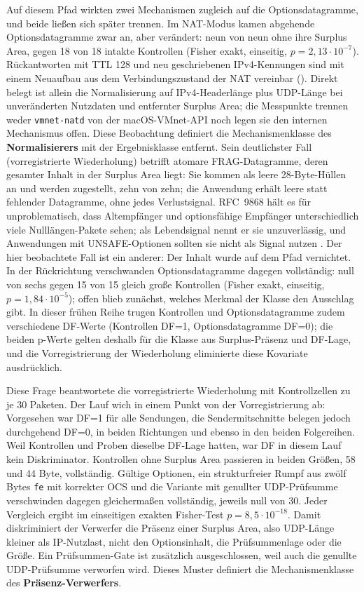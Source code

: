 Auf diesem Pfad wirkten zwei Mechanismen zugleich auf die Optionsdatagramme, und beide ließen sich
später trennen. Im NAT-Modus kamen abgehende Options\-datagramme zwar an, aber verändert:
neun von neun ohne ihre Surplus Area, gegen 18 von 18 intakte Kontrollen (Fisher exakt, einseitig,
$p = 2{,}13 \cdot 10^{-7}$). Rückantworten mit TTL 128 und neu geschriebenen IPv4-Kennungen sind mit
einem Neuaufbau aus dem Verbindungszustand der NAT vereinbar (). Direkt belegt
ist allein die Normalisierung auf IPv4-Headerlänge plus UDP-Länge bei unveränderten Nutzdaten und
entfernter Surplus Area; die Messpunkte trennen weder \texttt{vmnet-natd} von der macOS-VMnet-API noch
legen sie den internen Mechanismus offen. Diese Beobachtung definiert die Mechanismenklasse
des \textbf{Normalisierers} mit der Ergebnis\-klasse entfernt. Sein deutlichster Fall (vorregistrierte
Wiederholung) betrifft atomare FRAG-Datagramme, deren gesamter Inhalt in der Surplus Area
liegt: Sie kommen als leere 28-Byte-Hüllen an und werden zugestellt, zehn von zehn; die Anwendung erhält
leere statt fehlender Datagramme, ohne jedes Verlustsignal. RFC~9868 hält es für unproblematisch, dass
Alt\-emp\-fänger und optionsfähige Empfänger unterschiedlich viele Nulllängen-Pakete sehen; als Lebend\-signal
nennt er sie unzuverlässig, und Anwendungen mit UNSAFE-Optionen sollten sie nicht als Signal nutzen
\cite[Sec.~6, 12 und 18]{rfc9868}. Der hier beobachtete Fall ist ein anderer: Der Inhalt wurde auf
dem Pfad vernichtet. In der Rückrichtung verschwanden Optionsdatagramme dagegen vollständig: null von sechs
gegen 15 von 15 gleich große Kontrollen (Fisher exakt, einseitig, $p = 1{,}84 \cdot 10^{-5}$); offen blieb
zunächst, welches Merkmal der Klasse den Ausschlag gibt. In dieser frühen Reihe trugen Kontrollen und
Optionsdatagramme zudem verschiedene DF-Werte (Kontrollen DF=1, Optionsdatagramme DF=0); die beiden
p-Werte gelten deshalb für die Klasse aus Surplus-Präsenz und DF-Lage, und die Vorregistrierung der
Wiederholung eliminierte diese Kovariate ausdrücklich.

Diese Frage beantwortete die vorregistrierte Wiederholung mit Kontrollzellen zu je 30 Paketen. Der Lauf
wich in einem Punkt von der Vorregistrierung ab: Vorgesehen war DF=1 für alle Sendungen, die
Sendermitschnitte belegen jedoch durchgehend DF=0, in beiden Richtungen und ebenso in den beiden Folgereihen.
Weil Kontrollen und Proben dieselbe DF-Lage hatten, war DF in diesem Lauf kein Diskriminator. Kontrollen
ohne Surplus Area passieren in beiden Größen, 58 und 44 Byte, vollständig. Gültige Optionen, ein
strukturfreier Rumpf aus zwölf Bytes \texttt{fe} mit korrekter OCS und die Variante mit genullter
UDP-Prüfsumme verschwinden dagegen gleichermaßen vollständig, jeweils null von 30. Jeder Vergleich
ergibt im einseitigen exakten Fisher-Test $p = 8{,}5 \cdot 10^{-18}$. Damit diskriminiert der Verwerfer
die Präsenz einer Surplus Area, also UDP-Länge kleiner als IP-Nutzlast, nicht den Optionsinhalt, die
Prüfsummenlage oder die Größe. Ein Prüfsummen-Gate ist zusätzlich ausgeschlossen, weil auch die genullte
UDP-Prüfsumme verworfen wird. Dieses Muster definiert die Mechanismenklasse des
\textbf{Präsenz-Verwerfers}.

